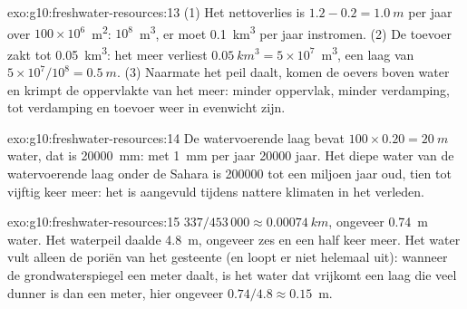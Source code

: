 \begin{solution}{exo:g10:freshwater-resources:13}
(1) Het nettoverlies is $1.2 - 0.2 = \qty{1.0}{m}$ per jaar over
$100 \times 10^6$~\unit{m^2}: $10^8$~\unit{m^3}, er moet \qty{0.1}{km^3} per jaar
instromen. (2) De toevoer zakt tot \qty{0.05}{km^3}: het meer verliest
$\qty{0.05}{km^3} = 5 \times 10^7$~\unit{m^3}, een laag van
$5 \times 10^7/10^8 = \qty{0.5}{m}$. (3) Naarmate het peil daalt, komen de
oevers boven water en krimpt de oppervlakte van het meer: minder oppervlak,
minder verdamping, tot verdamping en toevoer weer in evenwicht zijn.
\end{solution}

\begin{solution}{exo:g10:freshwater-resources:14}
De watervoerende laag bevat $100 \times 0.20 = \qty{20}{m}$ water, dat is
\qty{20000}{mm}: met \qty{1}{mm} per jaar \num{20000} jaar. Het diepe water van
de watervoerende laag onder de Sahara is \num{200000} tot een miljoen jaar oud,
tien tot vijftig keer meer: het is aangevuld tijdens nattere klimaten in het
verleden.
\end{solution}

\begin{solution}{exo:g10:freshwater-resources:15}
$337/453\,000 \approx \qty{0.00074}{km}$, ongeveer \qty{0.74}{m} water. Het
waterpeil daalde \qty{4.8}{m}, ongeveer zes en een half keer meer. Het water vult
alleen de poriën van het gesteente (en loopt er niet helemaal uit): wanneer de
grondwaterspiegel een meter daalt, is het water dat vrijkomt een laag die veel
dunner is dan een meter, hier ongeveer $0.74/4.8 \approx \num{0.15}$~m.
\end{solution}

